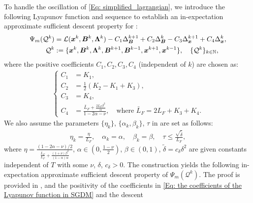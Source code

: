 To handle the oscillation of \eqref{Eq: simplified_lagrangian}, we introduce the following Lyapunov function and sequence to establish an in-expectation approximate sufficient descent property for :
\begin{align}
    \Psi_m(\mathcal{Q}^{k}) &= \mathcal{L}(\bm{x}^{k}, \bm{B}^{k}, \bm{\Lambda}^{k}) 
        - C_{1}\Delta_{\bm{B}}^{k+1} + C_{2}\Delta_{\bm{B}}^{k} 
        - C_{3}\Delta_{\bm{x}}^{k+1} + C_{4}\Delta_{\bm{x}}^{k}, 
        \label{Eq: the Lyapunov function in SGDM} \\
    \mathcal{Q}^{k} &:= \{\bm{x}^{k}, \bm{B}^{k}, \bm{\Lambda}^{k}, 
        \bm{B}^{k+1}, \bm{B}^{k-1}, \bm{x}^{k+1}, \bm{x}^{k-1}\}, 
        \quad \{\mathcal{Q}^{k}\}_{k \in \mathbb{N}}, \notag
\end{align}where the positive coefficients $C_1, C_2, C_3, C_4$ (independent of $k$) are chosen as:
\begin{align}
    \label{Eq: the coefficients of the Lyapunov function in SGDM}
    \begin{cases}
        C_{1} &= K_{1},\\
        C_{2} &= \frac{1}{2}(K_{2} - K_{1} + K_{3}),\\
        C_{3} &= K_{4},\\
        C_{4} &= \frac{\bar{L}_F + \frac{2L_F \beta^2}{\alpha}}{1 - 2\alpha - \nu}, 
            \quad \text{where } \bar{L}_{F} = 2L_{F} + K_{3} + K_{4}.
    \end{cases}
\end{align}
We also assume the parameters $\{\eta_{k}\}$, $\{\alpha_{k}, \beta_{k}\}$, $\tau$
in  are set as follows:
\begin{align}
    \label{Eq: the parameters conditions of dualhash-sgdm in suppl}\eta_{k}= \frac{\eta}{L_{F}},\quad \alpha_{k}= \alpha, \quad \beta_{k}= \beta,\quad \tau \leq \frac{\sqrt{\tilde{\delta}}}{L_{F}},
\end{align}
where
$\eta =\frac{(1 - 2\alpha - \nu)/2}{\frac{\bar{L}_{F}}{L_{F}} +
\frac{(1 + \nu)\beta^{2}}{(1 - \alpha)\alpha}}$, $\alpha \in ( 0, \frac{1 - \nu}{2}
)$, $\beta \in (0,1)$, $\tilde{\delta}= c_{\delta}\delta^{2}$ are given constants
independent of $T$ with some $\nu$, $\delta$, $c_{\delta}> 0$.
The construction yields the following in-expectation approximate sufficient
descent property of $\Psi_m(\mathcal{Q}^{k})$. The proof is provided in
, and the positivity of the coefficients in
\eqref{Eq: the coefficients of the Lyapunov function in SGDM} and the descent

